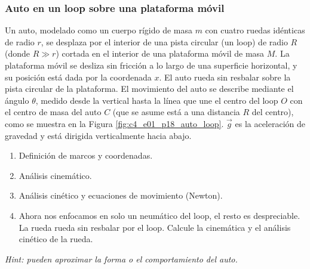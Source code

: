 \subsubsection{Auto en un loop sobre una plataforma móvil}

Un auto, modelado como un cuerpo rígido de masa $m$ con cuatro ruedas idénticas de radio $r$, se
desplaza por el interior de una pista circular (un loop) de radio $R$ (donde $R \gg r$) cortada en
el interior de una plataforma móvil de masa $M$. La plataforma móvil se desliza sin fricción a lo
largo de una superficie horizontal, y su posición está dada por la coordenada $x$. El auto rueda
sin resbalar sobre la pista circular de la plataforma. El movimiento del auto se describe mediante
el ángulo $\theta$, medido desde la vertical hasta la línea que une el centro del loop $O$ con el
centro de masa del auto $C$ (que se asume está a una distancia $R$ del centro), como se muestra en
la Figura \ref{fig:c4_e01_p18_auto_loop}. $\vec{g}$ es la aceleración de gravedad y está dirigida
verticalmente hacia abajo.

\begin{enumerate}
    \item Definición de marcos y coordenadas.
    \item Análisis cinemático.
    \item Análisis cinético y ecuaciones de movimiento (Newton).
    \item Ahora nos enfocamos en solo un neumático del loop, el resto es despreciable. La rueda
          rueda sin resbalar por el loop. Calcule la cinemática y el análisis cinético de la rueda.
\end{enumerate}

\textit{Hint: pueden aproximar la forma o el comportamiento del auto.}

